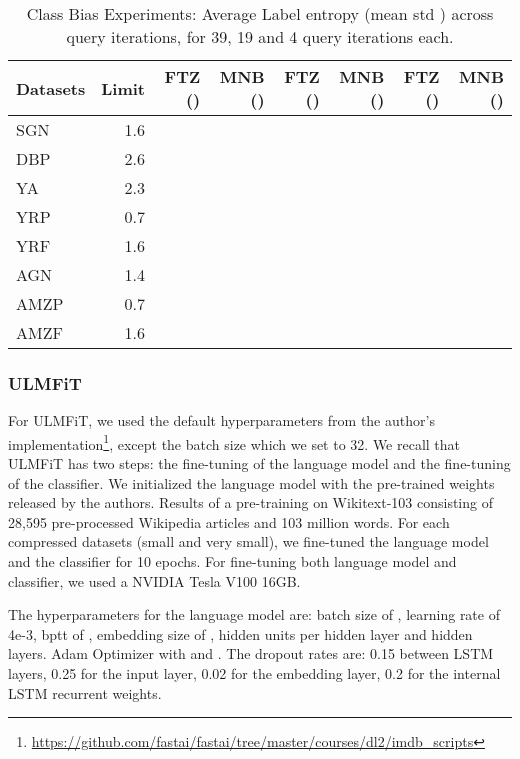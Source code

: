 \documentclass[11pt,a4paper]{article}
\begin{document}
\begin{table*}[t]
\small\addtolength{\tabcolsep}{-4.5pt}
  \centering
  \begin{tabular}{|l||r||r|r||r|r||r|r||}
  \hline 
  Datasets & Limit & FTZ () & MNB ()  &  FTZ () &  MNB () & FTZ () & MNB () \\ \hline \hline
  SGN & 1.6 &  &  &  &   &  &   \\ \hline 
DBP & 2.6 &  &  &  &   &  &  \\ \hline
  YA &  2.3 &  &   &    &    &   &    \\ \hline 
  YRP &  0.7 &   &  &   &   &   &   \\ \hline 
  YRF &  1.6 &   &   &  &   &   &  \\ \hline 
  AGN  & 1.4 &  &  &  &  &  &  \\ \hline 
  AMZP  & 0.7 &  &   &  &   &  &  \\ \hline 
  AMZF &  1.6  &   &   &   &    &   &  \\ \hline
  \end{tabular}
  \centering
\caption{Class Bias Experiments: Average Label entropy (mean  std ) across  query iterations, for 39, 19 and 4 query iterations each.} 
 \label{tab:label_entropy}
\end{table*}
\subsubsection{ULMFiT}
For ULMFiT, we used the default hyperparameters from the author's implementation\footnote{\url{https://github.com/fastai/fastai/tree/master/courses/dl2/imdb\_scripts}}, except the batch size which we set to 32. We recall that ULMFiT has two steps: the fine-tuning of the language model and the fine-tuning of the classifier. We initialized the language model with the  pre-trained weights released by the authors. Results of a pre-training on Wikitext-103 consisting of 28,595 pre-processed Wikipedia articles and 103 million words. For each compressed datasets (small and very small), we fine-tuned the language model and the classifier for 10 epochs. For fine-tuning both language model and classifier, we used a NVIDIA Tesla V100 16GB.   

The hyperparameters for the language model are: batch size of , learning rate of 4e-3, bptt of , embedding size of ,  hidden units per hidden layer and  hidden layers. Adam Optimizer with  and . The dropout rates are: 0.15 between LSTM layers, 0.25 for the input layer, 0.02 for the embedding layer, 0.2 for the internal LSTM recurrent weights.  
        
\end{document}
